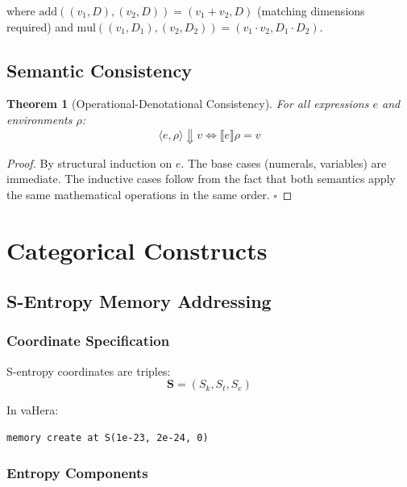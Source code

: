 \documentclass[twocolumn,10pt]{article}
\newcommand{\Scoord}{\mathbf{S}}
\newtheorem{theorem}{Theorem}[section]
\theoremstyle{definition}
\theoremstyle{remark}
\begin{document}
where $\text{add}((v_1, D), (v_2, D)) = (v_1 + v_2, D)$ (matching dimensions required) and $\text{mul}((v_1, D_1), (v_2, D_2)) = (v_1 \cdot v_2, D_1 \cdot D_2)$.

\subsection{Semantic Consistency}

\begin{theorem}[Operational-Denotational Consistency]
For all expressions $e$ and environments $\rho$:
\begin{equation}
    \langle e, \rho\rangle \Downarrow v \iff \llbracket e\rrbracket \rho = v
\end{equation}
\end{theorem}

\begin{proof}
By structural induction on $e$. The base cases (numerals, variables) are immediate. The inductive cases follow from the fact that both semantics apply the same mathematical operations in the same order. $\square$
\end{proof}

\section{Categorical Constructs}
\label{sec:categorical}

\subsection{S-Entropy Memory Addressing}

\subsubsection{Coordinate Specification}

S-entropy coordinates are triples:
\begin{equation}
    \Scoord = (S_k, S_t, S_e)
\end{equation}

In vaHera:
\begin{lstlisting}
memory create at S(1e-23, 2e-24, 0)
\end{lstlisting}

\subsubsection{Entropy Components}
\end{document}
